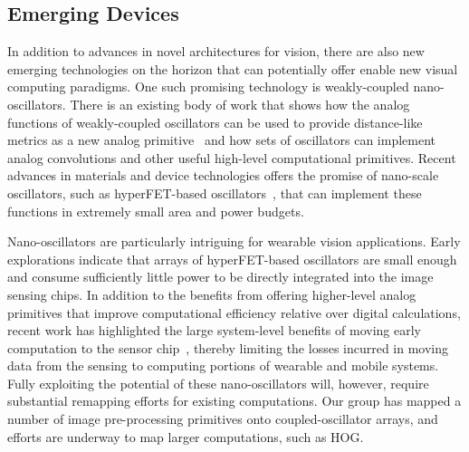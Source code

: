 \subsection{Emerging Devices}
In addition to advances in novel architectures for vision, there are
also new emerging technologies on the horizon that can potentially
offer enable new visual computing paradigms. One such promising
technology is weakly-coupled nano-oscillators. There is an existing
body of work that shows how the analog functions of weakly-coupled
oscillators can be used to provide distance-like metrics as a new
analog primitive~\cite{} and how sets of oscillators can implement
analog convolutions and other useful high-level computational
primitives. Recent advances in materials and device technologies
offers the promise of nano-scale oscillators, such as hyperFET-based
oscillators~\cite{}, that can implement these functions in extremely
small area and power budgets.

Nano-oscillators are particularly intriguing for wearable vision
applications. Early explorations indicate that arrays of
hyperFET-based oscillators are small enough and consume sufficiently
little power to be directly integrated into the image sensing
chips. In addition to the benefits from offering higher-level analog
primitives that improve computational efficiency relative over digital
calculations, recent work has highlighted the large system-level
benefits of moving early computation to the sensor chip~,
thereby limiting the losses incurred in moving data from the sensing
to computing portions of wearable and mobile systems. Fully exploiting
the potential of these nano-oscillators will, however, require
substantial remapping efforts for existing computations. Our group has
mapped a number of image pre-processing primitives onto
coupled-oscillator arrays, and efforts are underway to map larger
computations, such as HOG.
